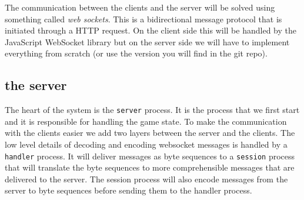 \documentclass[a4paper,11pt]{article}
\begin{document}
The communication between the clients and the server will be solved
using something called {\em web sockets}. This is a bidirectional
message protocol that is initiated through a HTTP request. On the
client side this will be handled by the JavaScript WebSocket library
but on the server side we will have to implement everything from
scratch (or use the version you will find in the git repo).

\subsection*{the server}

The heart of the system is the {\tt server} process. It is the process
that we first start and it is responsible for handling the game
state. To make the communication with the clients easier we add two
layers between the server and the clients. The low level details of
decoding and encoding websocket messages is handled by a {\tt handler}
process. It will deliver messages as byte sequences to a {\tt session}
process that will translate the byte sequences to more comprehensible
messages that are delivered to the server. The session process will
also encode messages from the server to byte sequences before sending
them to the handler process. 
\end{document}
